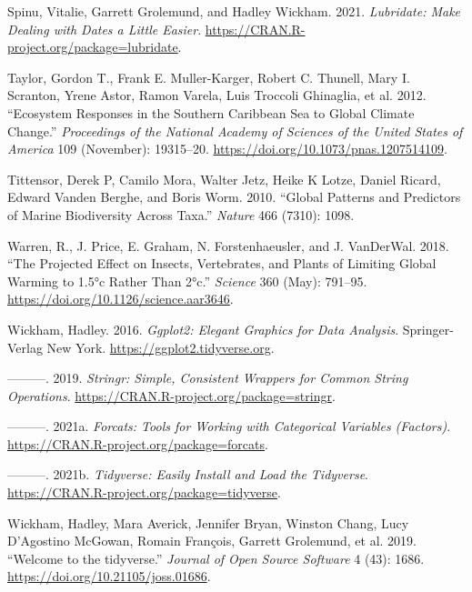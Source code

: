 \documentclass[
]{book}
\newlength{\cslhangindent}
\newlength{\cslentryspacingunit} %
\newenvironment{CSLReferences}[2] %
 {%
  \setlength{\parindent}{0pt}
  \ifodd #1
  \let\oldpar\par
  \def\par{\hangindent=\cslhangindent\oldpar}
  \fi
  \setlength{\parskip}{#2\cslentryspacingunit}
 }%
 {}
\begin{document}
\begin{CSLReferences}{1}{0}
\leavevmode{}%
Spinu, Vitalie, Garrett Grolemund, and Hadley Wickham. 2021. \emph{Lubridate: Make Dealing with Dates a Little Easier}. \url{https://CRAN.R-project.org/package=lubridate}.

\leavevmode{}%
Taylor, Gordon T., Frank E. Muller-Karger, Robert C. Thunell, Mary I. Scranton, Yrene Astor, Ramon Varela, Luis Troccoli Ghinaglia, et al. 2012. {``Ecosystem Responses in the Southern Caribbean Sea to Global Climate Change.''} \emph{Proceedings of the National Academy of Sciences of the United States of America} 109 (November): 19315--20. \url{https://doi.org/10.1073/pnas.1207514109}.

\leavevmode{}%
Tittensor, Derek P, Camilo Mora, Walter Jetz, Heike K Lotze, Daniel Ricard, Edward Vanden Berghe, and Boris Worm. 2010. {``Global Patterns and Predictors of Marine Biodiversity Across Taxa.''} \emph{Nature} 466 (7310): 1098.

\leavevmode{}%
Warren, R., J. Price, E. Graham, N. Forstenhaeusler, and J. VanDerWal. 2018. {``The Projected Effect on Insects, Vertebrates, and Plants of Limiting Global Warming to 1.5°c Rather Than 2°c.''} \emph{Science} 360 (May): 791--95. \url{https://doi.org/10.1126/science.aar3646}.

\leavevmode{}%
Wickham, Hadley. 2016. \emph{Ggplot2: Elegant Graphics for Data Analysis}. Springer-Verlag New York. \url{https://ggplot2.tidyverse.org}.

\leavevmode{}%
---------. 2019. \emph{Stringr: Simple, Consistent Wrappers for Common String Operations}. \url{https://CRAN.R-project.org/package=stringr}.

\leavevmode{}%
---------. 2021a. \emph{Forcats: Tools for Working with Categorical Variables (Factors)}. \url{https://CRAN.R-project.org/package=forcats}.

\leavevmode{}%
---------. 2021b. \emph{Tidyverse: Easily Install and Load the Tidyverse}. \url{https://CRAN.R-project.org/package=tidyverse}.

\leavevmode{}%
Wickham, Hadley, Mara Averick, Jennifer Bryan, Winston Chang, Lucy D'Agostino McGowan, Romain François, Garrett Grolemund, et al. 2019. {``Welcome to the {tidyverse}.''} \emph{Journal of Open Source Software} 4 (43): 1686. \url{https://doi.org/10.21105/joss.01686}.


\end{CSLReferences}
\end{document}
